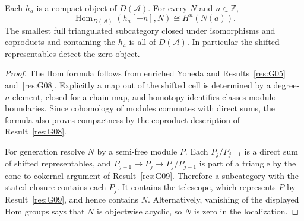 \begin{theorem}\label{res:G10}
Each \(h_a\) is a compact object of \(D(\mathcal A)\). For every
\(N\) and \(n\in\mathbb Z\),
\[
       \operatorname{Hom}_{D(\mathcal A)}(h_a[-n],N)
           \cong H^n(N(a)).
\]
The smallest full triangulated subcategory closed under
isomorphisms and coproducts and containing the \(h_a\) is all of
\(D(\mathcal A)\). In particular the shifted representables detect
the zero object.
\end{theorem}
\begin{proof}
The Hom formula follows from enriched Yoneda and
Results~\ref{res:G05} and~\ref{res:G08}. Explicitly a map out of
the shifted cell is determined by a degree-\(n\) element, closed
for a chain map, and homotopy identifies classes modulo boundaries.
Since cohomology of modules commutes with direct sums, the formula
also proves compactness by the coproduct description of
Result~\ref{res:G08}.

For generation resolve \(N\) by a semi-free module \(P\). Each
\(P_j/P_{j-1}\) is a direct sum of shifted representables, and
\(P_{j-1}\to P_j\to P_j/P_{j-1}\) is part of a triangle by the
cone-to-cokernel argument of Result~\ref{res:G09}. Therefore a
subcategory with the stated closure contains each \(P_j\).
It contains the telescope, which represents \(P\) by
Result~\ref{res:G09}, and hence contains \(N\). Alternatively,
vanishing of the displayed Hom groups says that \(N\) is
objectwise acyclic, so \(N\) is zero in the localization.
\end{proof}

